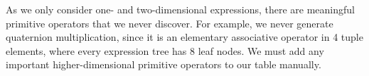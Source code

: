 

As we only consider one- and two-dimensional expressions, there are meaningful primitive operators that we never discover. For example, we never generate quaternion multiplication, since it is an elementary associative operator in 4 tuple elements, where every expression tree has 8 leaf nodes. We must add any important higher-dimensional primitive operators to our table manually.






